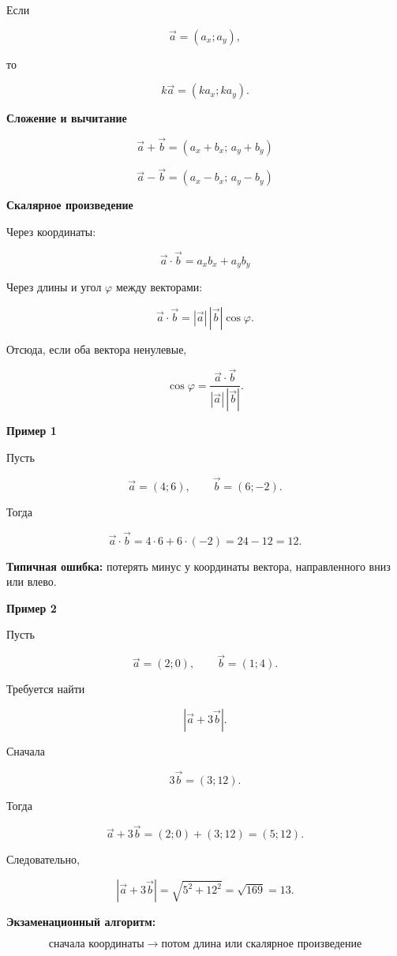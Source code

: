 \documentclass[a4paper,12pt]{article}
\newcommand{\subtopic}[1]{%
  \vspace{0.45em}
  {\large\bfseries\textcolor{accent}{#1}}\par
  \vspace{0.2em}
}
\newcommand{\key}[1]{\textcolor{darkaccent}{\textbf{#1}}}
\begin{document}
Если

\[
\vec a=(a_x;a_y),
\]

то

\[
\boxed{
k\vec a=(ka_x;ka_y).
}
\]

\subtopic{Сложение и вычитание}

\[
\boxed{
\vec a+\vec b
=
(a_x+b_x;\,a_y+b_y)
}
\]

\[
\boxed{
\vec a-\vec b
=
(a_x-b_x;\,a_y-b_y)
}
\]

\subtopic{Скалярное произведение}

Через координаты:

\[
\boxed{
\vec a\cdot\vec b
=
a_xb_x+a_yb_y
}
\]

Через длины и угол \(\varphi\) между векторами:

\[
\boxed{
\vec a\cdot\vec b
=
|\vec a|\,|\vec b|\cos\varphi.
}
\]

Отсюда, если оба вектора ненулевые,

\[
\boxed{
\cos\varphi
=
\frac{\vec a\cdot\vec b}
{|\vec a|\,|\vec b|}.
}
\]

\subtopic{Пример 1}

Пусть

\[
\vec a=(4;6),
\qquad
\vec b=(6;-2).
\]

Тогда

\[
\vec a\cdot\vec b
=
4\cdot6+6\cdot(-2)
=
24-12
=
\boxed{12}.
\]

\key{Типичная ошибка:}
потерять минус у координаты вектора, направленного вниз или влево.

\subtopic{Пример 2}

Пусть

\[
\vec a=(2;0),
\qquad
\vec b=(1;4).
\]

Требуется найти

\[
|\vec a+3\vec b|.
\]

Сначала

\[
3\vec b=(3;12).
\]

Тогда

\[
\vec a+3\vec b
=
(2;0)+(3;12)
=
(5;12).
\]

Следовательно,

\[
|\vec a+3\vec b|
=
\sqrt{5^2+12^2}
=
\sqrt{169}
=
\boxed{13}.
\]

\key{Экзаменационный алгоритм:}

\[
\boxed{
\text{сначала координаты}
\;\longrightarrow\;
\text{потом длина или скалярное произведение}
}
\]

\end{document}

